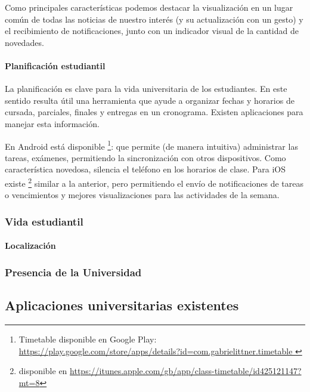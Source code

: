 Como principales características podemos destacar la visualización en un lugar común de todas las noticias de nuestro interés (y su actualización con un gesto) y el recibimiento de notificaciones, junto con un indicador visual de la cantidad de novedades.

\paragraph{Planificación estudiantil}

La planificación es clave para la vida universitaria de los estudiantes. En este sentido resulta útil una herramienta que ayude a organizar fechas y horarios
de cursada, parciales, finales y entregas en un cronograma. Existen 
aplicaciones para manejar esta información.

En Android está disponible  \footnote{Timetable disponible en Google Play: \url{https://play.google.com/store/apps/details?id=com.gabrielittner.timetable } }:
que permite (de manera intuitiva) administrar las tareas, exámenes, permitiendo la sincronización con otros dispositivos. Como característica novedosa, silencia el teléfono en los horarios
de clase.
Para iOS existe 
\footnote{ disponible en
\url{https://itunes.apple.com/gb/app/class-timetable/id425121147?mt=8} } similar
a la anterior, pero permitiendo el envío de notificaciones de tareas o
vencimientos y mejores visualizaciones para las actividades de la semana.

\subsubsection{Vida estudiantil}
\label{aplicaciones_utiles_existentes_vida}

\paragraph{Localización}
\label{aplicaciones_utiles_existentes_localizacion}

\subsubsection{Presencia de la Universidad}
\label{aplicaciones_utiles_existentes_presencia}

\subsection{Aplicaciones universitarias existentes}
\label{aplicaciones_universitarias_existentes}

